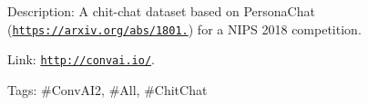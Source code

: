 Description\+: A chit-\/chat dataset based on Persona\+Chat (\href{https://arxiv.org/abs/1801.07243}{\tt https\+://arxiv.\+org/abs/1801.}) for a N\+I\+PS 2018 competition.

Link\+: \href{http://convai.io/}{\tt http\+://convai.\+io/}.

Tags\+: \#\+Conv\+A\+I2, \#\+All, \#\+Chit\+Chat 